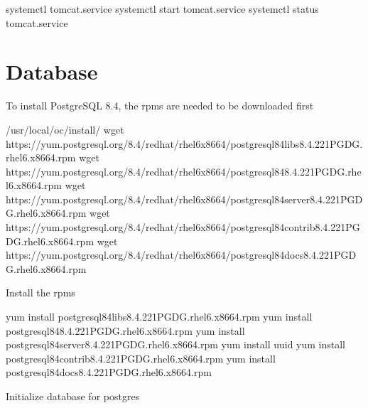 \documentclass[letterpaper,10pt,english]{sphinxmanual}
\begin{document}
%
\begin{sphinxVerbatim}[commandchars=\\\{\}]
systemctl  tomcat.service
systemctl start tomcat.service
systemctl status tomcat.service
\end{sphinxVerbatim}


\section{Database}
\label{\detokenize{trl1:database}}
To install PostgreSQL 8.4, the rpms are needed to be downloaded first

%
\begin{sphinxVerbatim}[commandchars=\\\{\}]
 /usr/local/oc/install/
wget https://yum.postgresql.org/8.4/redhat/rhel\PYGZhy{}6\PYGZhy{}x86\PYGZus{}64/postgresql84\PYGZhy{}libs\PYGZhy{}8.4.22\PYGZhy{}1PGDG.rhel6.x86\PYGZus{}64.rpm
wget https://yum.postgresql.org/8.4/redhat/rhel\PYGZhy{}6\PYGZhy{}x86\PYGZus{}64/postgresql84\PYGZhy{}8.4.22\PYGZhy{}1PGDG.rhel6.x86\PYGZus{}64.rpm
wget https://yum.postgresql.org/8.4/redhat/rhel\PYGZhy{}6\PYGZhy{}x86\PYGZus{}64/postgresql84\PYGZhy{}server\PYGZhy{}8.4.22\PYGZhy{}1PGDG.rhel6.x86\PYGZus{}64.rpm
wget https://yum.postgresql.org/8.4/redhat/rhel\PYGZhy{}6\PYGZhy{}x86\PYGZus{}64/postgresql84\PYGZhy{}contrib\PYGZhy{}8.4.22\PYGZhy{}1PGDG.rhel6.x86\PYGZus{}64.rpm
wget https://yum.postgresql.org/8.4/redhat/rhel\PYGZhy{}6\PYGZhy{}x86\PYGZus{}64/postgresql84\PYGZhy{}docs\PYGZhy{}8.4.22\PYGZhy{}1PGDG.rhel6.x86\PYGZus{}64.rpm
\end{sphinxVerbatim}

Install the rpms

%
\begin{sphinxVerbatim}[commandchars=\\\{\}]
yum install postgresql84\PYGZhy{}libs\PYGZhy{}8.4.22\PYGZhy{}1PGDG.rhel6.x86\PYGZus{}64.rpm
yum install postgresql84\PYGZhy{}8.4.22\PYGZhy{}1PGDG.rhel6.x86\PYGZus{}64.rpm
yum install postgresql84\PYGZhy{}server\PYGZhy{}8.4.22\PYGZhy{}1PGDG.rhel6.x86\PYGZus{}64.rpm
yum install uuid
yum install postgresql84\PYGZhy{}contrib\PYGZhy{}8.4.22\PYGZhy{}1PGDG.rhel6.x86\PYGZus{}64.rpm
yum install postgresql84\PYGZhy{}docs\PYGZhy{}8.4.22\PYGZhy{}1PGDG.rhel6.x86\PYGZus{}64.rpm
\end{sphinxVerbatim}

Initialize database for postgres
\end{document}
